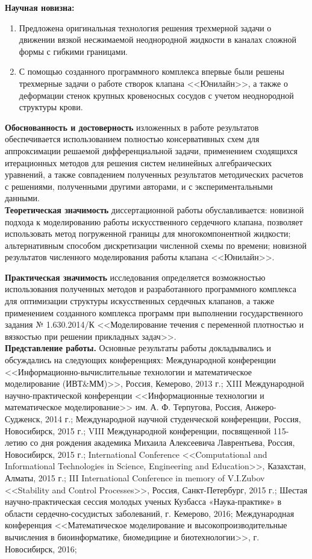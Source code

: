 \textbf{Научная новизна:}
\begin{enumerate}
 \item Предложена оригинальная технология решения трехмерной задачи о движении
     вязкой несжимаемой неоднородной жидкости в каналах сложной формы с гибкими
     границами.
 \item С помощью созданного программного комплекса впервые были решены
     трехмерные задачи о работе створок клапана <<Юнилайн>>, а также о деформации стенок
     крупных кровеносных сосудов с учетом неоднородной структуры крови.
\end{enumerate}

\textbf{Обоснованность и достоверность} изложенных в работе результатов
обеспечивается использованием полностью консервативных схем для аппроксимации
решаемой дифференциальной задачи, применением сходящихся итерационных методов
для решения систем нелинейных алгебраических уравнений, а также совпадением
полученных результатов методических расчетов с решениями, полученными другими
авторами, и с экспериментальными данными.\\

\textbf{Теоретическая значимость} диссертационной работы обуславливается:
новизной подхода к моделированию работы искусственного сердечного клапана,
позволяет использовать метод погруженной границы для многокомпонентной жидкости;
альтернативным способом дискретизации численной схемы по времени; новизной
результатов численного моделирования работы клапана <<Юнилайн>>.

\textbf{Практическая значимость} исследования определяется
возможностью использования полученных методов и разработанного программного
комплекса для оптимизации структуры искусственных сердечных клапанов, а также
применением созданного комплекса программ при выполнении государственного
задания № 1.630.2014/К <<Моделирование течения с переменной плотностью
и вязкостью при решении прикладных задач>>.\\

\textbf{Представление работы.}
Основные результаты работы докладывались и обсуждались на следующих
конференциях: Международной конференции <<Информационно-вычислительные
технологии и математическое моделирование (ИВТ\&ММ)>>, Россия, Кемерово, 2013
г.; XIII Международной научно-практической конференции <<Информационные
технологии и математическое моделирование>> им. А. Ф. Терпугова, Россия,
Анжеро-Судженск, 2014 г.; Международной научной студенческой конференции,
Россия, Новосибирск, 2015 г.; VIII Международной конференции, посвященной
115-летию со дня рождения академика Михаила Алексеевича Лаврентьева, Россия,
Новосибирск, 2015 г.; International Conference <<Computational and
Informational Technologies in Science, Engineering and Education>>, Казахстан,
Алматы, 2015 г.; III International Conference in memory of V.I.Zubov
<<Stability and Control Processes>>, Россия, Санкт-Петербург, 2015 г.; Шестая
научно-практическая сессия молодых ученых Кузбасса «Наука-практике» в области
сердечно-сосудистых заболеваний, г. Кемерово, 2016; Международная конференция
<<Математическое моделирование и высокопроизводительные вычисления в
биоинформатике, биомедицине и биотехнологии>>, г. Новосибирск, 2016;

